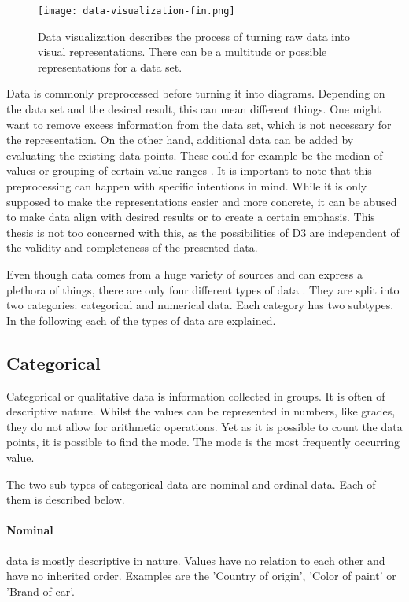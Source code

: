 \begin{figure}
    \texttt{[image: data-visualization-fin.png]}
    \captionsetup{width=0.9\textwidth}
    \caption[data-visualization]{Data visualization describes the process of turning raw data into visual representations. There can be a multitude or possible representations for a data set.}
    \label{fig:data-visualization}
\end{figure}

Data is commonly preprocessed before turning it into diagrams. Depending on the data set and the desired result, this can mean different things. One might want to remove excess information from the data set, which is not necessary for the representation. On the other hand, additional data can be added by evaluating the existing data points. These could for example be the median of values or grouping of certain value ranges \cite{garcia2015data}. It is important to note that this preprocessing can happen with specific intentions in mind. While it is only supposed to make the representations easier and more concrete, it can be abused to make data align with desired results or to create a certain emphasis. This thesis is not too concerned with this, as the possibilities of D3 are independent of the validity and completeness of the presented data.

Even though data comes from a huge variety of sources and can express a plethora of things, there are only four different types of data \cite{henze_2021}. They are split into two categories: categorical and numerical data. Each category has two subtypes. In the following each of the types of data are explained.

\subsection{Categorical}

Categorical or qualitative data is information collected in groups. It is often of descriptive nature. Whilst the values can be represented in numbers, like grades, they do not allow for arithmetic operations. Yet as it is possible to count the data points, it is possible to find the mode. The mode is the most frequently occurring value.

The two sub-types of categorical data are nominal and ordinal data. Each of them is described below.

\paragraph{Nominal}
data is mostly descriptive in nature. Values have no relation to each other and have no inherited order. Examples are the 'Country of origin', 'Color of paint' or 'Brand of car'.

